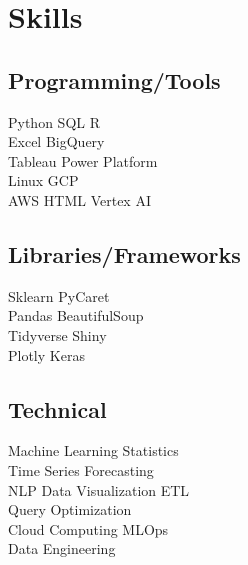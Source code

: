 \documentclass[]{plushcv}
\begin{document}
\begin{minipage}[t]{0.25\textwidth} 


\section{Skills}
\subsection{Programming/Tools}
\sectionsep
{}
Python \textbullet{} SQL \textbullet{} R  \\
Excel \textbullet{} BigQuery \\
\sectionsep
{}
Tableau \textbullet{} Power Platform \textbullet{}  \\
Linux \textbullet{} GCP \\
\sectionsep
{}
AWS \textbullet{} HTML \textbullet{} Vertex AI \\
\sectionsep
\sectionsep
\subsection{Libraries/Frameworks}
\sectionsep
Sklearn \textbullet{} PyCaret \textbullet{} \\
Pandas \textbullet{} BeautifulSoup \textbullet{} \\
Tidyverse \textbullet{} Shiny \textbullet{} \\
Plotly \textbullet{} Keras \\


\sectionsep
\sectionsep
\subsection{Technical}
\sectionsep
Machine Learning \textbullet{} Statistics \\
Time Series Forecasting \textbullet{} \\
NLP  \textbullet{} Data Visualization \textbullet{} ETL \\
Query Optimization \textbullet{} \\ 
Cloud Computing \textbullet{} MLOps \\
Data Engineering \\

\sectionsep



\end{minipage}
\end{document}
